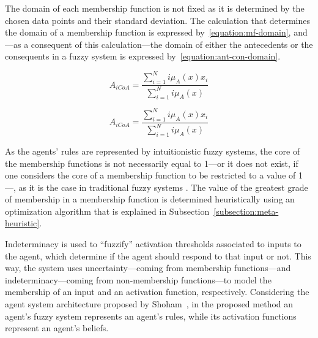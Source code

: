 \documentclass{ieeeaccess}
\begin{document}
The domain of each membership function is not fixed as it is determined by the
chosen data points and their standard deviation. The calculation that determines
the domain of a membership function is expressed by~\ref{equation:mf-domain}, and---as a consequent of this
calculation---the domain of either the antecedents or the consequents in a fuzzy
system is expressed by~\ref{equation:ant-con-domain}. %


\begin{equation}
  \label{equation:mf-domain}
  A_{iCoA} = \dfrac{\sum_{i=1}^{N} i\mu_{A}(x) x_{i}}{\sum_{i=1}^{N}
    i\mu_{A}(x)}
\end{equation}

\begin{equation}
  \label{equation:ant-con-domain}
  A_{iCoA} = \dfrac{\sum_{i=1}^{N} i\mu_{A}(x) x_{i}}{\sum_{i=1}^{N}
    i\mu_{A}(x)}
\end{equation}

As the agents' rules are represented by intuitionistic fuzzy systems, the core of
the membership functions is not necessarily equal to 1---or it does not exist,
if one considers the core of a membership function to be restricted to a value
of 1---, as it is the case in traditional fuzzy systems \cite{wygralak2000axiomatic}. %
The value of the greatest
grade of membership in a membership function is determined heuristically using
an optimization algorithm that is explained in
Subsection~\ref{subsection:meta-heuristic}.

Indeterminacy is used to ``fuzzify'' activation thresholds associated to inputs
to the agent, which determine if the agent should respond to that input or
not. This way, the system uses uncertainty---coming from membership
functions---and indeterminacy---coming from non-membership functions---to model
the membership of an input and an activation function,
respectively. Considering the agent system architecture proposed by
Shoham~\cite{Shoham1993}, in the proposed method an agent's fuzzy system
represents an agent's rules, while its activation functions represent an
agent's beliefs.
\end{document}
